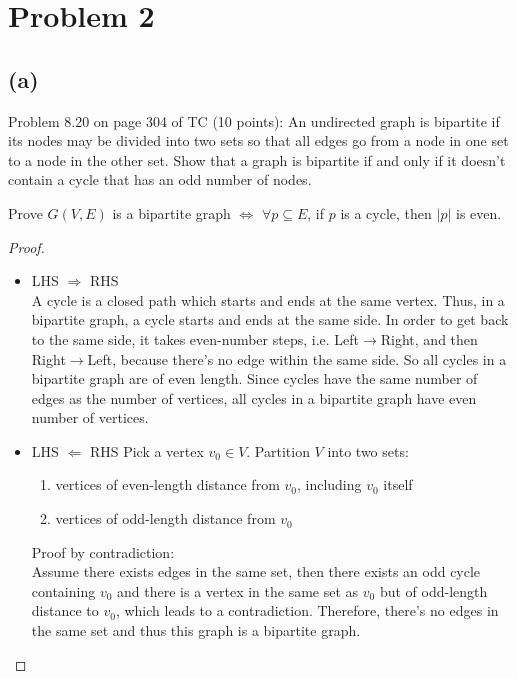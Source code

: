 \documentclass[twoside,11pt]{homework}
\begin{document}
\section*{Problem 2}

\subsection*{(a)}

\begin{prob}
  Problem 8.20 on page 304 of TC (10 points):
  An undirected graph is bipartite if its nodes may be divided into two sets so
  that all edges go from a node in one set to a node in the other set.
  Show that a graph is bipartite if and only if it doesn't contain a cycle that
  has an odd number of nodes.
\end{prob}

\begin{goal}
  Prove $G(V,E)$ is a bipartite graph $\Leftrightarrow$ $\forall p \subseteq E$, if $p$ is a cycle, then $|p|$ is even.
\end{goal}

\begin{proof}
  \ \\
  \begin{itemize}
  \item LHS $\Rightarrow$ RHS
    \ \\
    A cycle is a closed path which starts and ends at the same vertex.
    Thus, in a bipartite graph, a cycle starts and ends at the same side.
    In order to get back to the same side, it takes even-number steps,
    i.e. Left$\rightarrow$Right, and then Right$\rightarrow$Left, because there's no edge within the
    same side. So all cycles in a bipartite graph are of even length. Since
    cycles have the same number of edges as the number of vertices, all cycles
    in a bipartite graph have even number of vertices.
  \item LHS $\Leftarrow$ RHS
    Pick a vertex $v_0 \in V$.
    Partition $V$ into two sets:
    \begin{enumerate}
    \item vertices of even-length distance from $v_0$, including $v_0$ itself
    \item vertices of odd-length distance from $v_0$
    \end{enumerate}

    Proof by contradiction:\\
    Assume there exists edges in the same set, then there exists an odd cycle
    containing $v_0$ and there is a vertex in the same set as $v_0$ but of
    odd-length distance to $v_0$, which leads to a contradiction.
    Therefore, there's no edges in the same set and thus this graph is a bipartite graph.
  \end{itemize}
  
\end{proof}
\end{document}
